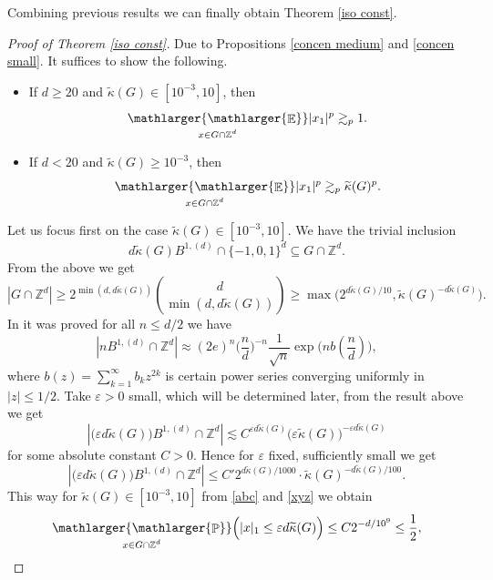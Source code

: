 \documentclass[a4paper,oneside, reqno]{amsart}
\numberwithin{equation}{section}
\theoremstyle{definition}%
\theoremstyle{definition}
\theoremstyle{definition}%
\theoremstyle{definition}
\newcommand{\E}{\mathop{\mathbb{E}}}
\newcommand{\Pro}{\mathop{\mathbb{P}}}
\newcommand{\Z}{\mathbb{Z}}
\newcommand{\se}[1]{\underset{_{\substack{#1}}}{\mathlarger{\mathlarger{\E}}}}
\newcommand{\spr}[1]{\underset{_{\substack{#1}}}{\mathlarger{\mathlarger{\Pro}}}}
\begin{document}
Combining previous results we can finally obtain Theorem \ref{iso const}.
\begin{proof}[Proof of Theorem \ref{iso const}]
    Due to Propositions \ref{concen medium} and \ref{concen small}. It suffices to show the following.
    \begin{itemize}
        \item If $d \ge 20$ and $\widetilde{\kappa}(G) \in [10^{-3},10]$, then
        \[
        \se{x \in G \cap \Z^d} |x_1|^p  \gtrsim_p 1.
        \]
        \item If $d<20$ and $\widetilde{\kappa}(G) \ge 10^{-3}$, then 
        \[
        \se{x \in G \cap \Z^d} |x_1|^p \gtrsim_p \widetilde{\kappa}(G)^p.
        \]
    \end{itemize}
    Let us focus first on the case $\widetilde{\kappa}(G) \in [10^{-3},10]$.
    We have the trivial inclusion
    \[
    d \widetilde{\kappa}(G) B^{1,(d)} \cap \{-1,0,1 \}^d \subseteq G \cap \Z^d.
    \]
    From the above we get 
    \begin{equation} \label{abc}
        |G \cap \Z^d| \ge 2^{ \min(d,d\widetilde{\kappa}(G))} \binom{d}{\min(d,d \widetilde{\kappa}(G))} \ge \max\Big(2^{d \widetilde{\kappa}(G)/10}, \widetilde{\kappa}(G)^{-d \widetilde{\kappa}(G)}\Big).
    \end{equation}
    In \cite[Theorem 1.4]{KNW} it was proved for all $n \le d/2$ we have
    \[
    |nB^{1,(d)} \cap \Z^d| \approx (2e)^n \Big( \frac{n}{d}\Big)^{-n}  \frac{1}{\sqrt{n}}\exp \big( nb(\frac{n}{d}) \big),
    \]
    where $b(z)=\sum_{k=1}^\infty b_k z^{2k}$ is certain power series converging uniformly in $|z| \le 1/2$.
    Take $\varepsilon>0$ small, which will be determined later, from the result above we get 
    \[
    |\big(\varepsilon d \widetilde{\kappa}(G)\big)B^{1,(d)} \cap \Z^d| \lesssim C^{\varepsilon d \widetilde{\kappa}(G)} \Big(\varepsilon \widetilde{\kappa}(G) \Big)^{-\varepsilon d \widetilde{\kappa}(G)}
    \]
    for some absolute constant $C>0$. Hence for $\varepsilon$ fixed, sufficiently small we get 
    \begin{equation} \label{xyz}
        |\big(\varepsilon d \widetilde{\kappa}(G)\big)B^{1,(d)} \cap \Z^d| \le C' 2^{d \widetilde{\kappa}(G)/1000} \cdot \widetilde{\kappa}(G)^{-d \widetilde{\kappa}(G)/100}.
    \end{equation}
    This way for $\widetilde{\kappa}(G) \in [10^{-3},10]$ from \eqref{abc} and \eqref{xyz} we obtain
    \[
    \spr{x \in G \cap \Z^d}\Big(|x|_1 \le \varepsilon d \widetilde{\kappa}(G)\Big) \le C 2^{-d/10^9} \le \frac{1}{2},
\]
\end{proof}
\end{document}
